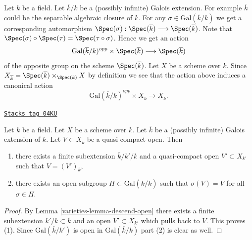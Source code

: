 Let $k$ be a field. Let $\overline{k}/k$ be a (possibly infinite)
Galois extension. For example $\overline{k}$ could be the
separable algebraic closure of $k$.
For any $\sigma \in \text{Gal}(\overline{k}/k)$ we get a corresponding
automorphism
$
\Spec(\sigma) :
\Spec(\overline{k})
\longrightarrow
\Spec(\overline{k})
$.
Note that
$\Spec(\sigma) \circ \Spec(\tau) = \Spec(\tau \circ \sigma)$.
Hence we get an action
$$
\text{Gal}(\overline{k}/k)^{opp} \times \Spec(\overline{k})
\longrightarrow
\Spec(\overline{k})
$$
of the opposite group on the scheme $\Spec(\overline{k})$.
Let $X$ be a scheme over $k$. Since
$X_{\overline{k}} =
\Spec(\overline{k}) \times_{\Spec(k)} X$
by definition we see that the action above induces a canonical action
\begin{equation}
\label{equation-galois-action-base-change-kbar}
\text{Gal}(\overline{k}/k)^{opp} \times X_{\overline{k}}
\longrightarrow
X_{\overline{k}}.
\end{equation}

\begin{lemma}
\label{varieties-lemma-Galois-action-quasi-compact-open}
\href{https://stacks.math.columbia.edu/tag/04KU}{\texttt{Stacks tag 04KU}}

Let $k$ be a field. Let $X$ be a scheme over $k$.
Let $\overline{k}$ be a (possibly infinite) Galois extension of $k$.
Let $V \subset X_{\overline{k}}$ be a quasi-compact open.
Then
\begin{enumerate}
\item there exists a finite subextension $\overline{k}/k'/k$
and a quasi-compact open $V' \subset X_{k'}$ such that
$V = (V')_{\overline{k}}$,
\item there exists an open subgroup $H \subset \text{Gal}(\overline{k}/k)$
such that $\sigma(V) = V$ for all $\sigma \in H$.
\end{enumerate}
\end{lemma}

\begin{proof}

By Lemma \ref{varieties-lemma-descend-open} there exists a finite subextension
$k'/k \subset \overline{k}$ and an open $V' \subset X_{k'}$
which pulls back to $V$. This proves (1). Since $\text{Gal}(\overline{k}/k')$
is open in $\text{Gal}(\overline{k}/k)$ part (2) is clear as well.
\end{proof}

